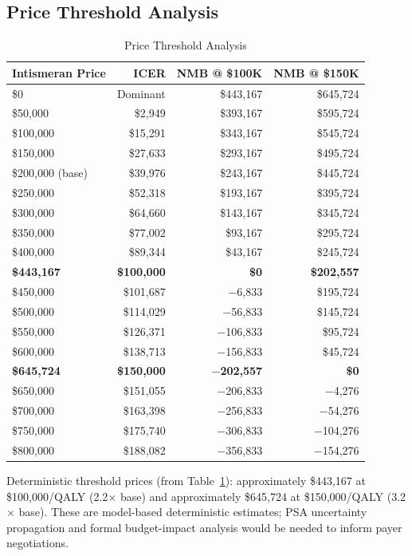 \documentclass[11pt,a4paper]{article}
\begin{document}
\subsection{Price Threshold Analysis}
\label{sec:price_threshold}
\begin{table}[H]
\centering
\caption{Price Threshold Analysis}
\label{tab:s14}
\begin{tabular*}{\textwidth}{@{\extracolsep{\fill}}lrrr}
\toprule
\textbf{Intismeran Price} & \textbf{ICER} & \textbf{NMB @ \$100K} & \textbf{NMB @ \$150K} \\
\midrule
\$0 & Dominant & \$443,167 & \$645,724 \\
\$50,000 & \$2,949 & \$393,167 & \$595,724 \\
\$100,000 & \$15,291 & \$343,167 & \$545,724 \\
\$150,000 & \$27,633 & \$293,167 & \$495,724 \\
\$200,000 (base) & \$39,976 & \$243,167 & \$445,724 \\
\$250,000 & \$52,318 & \$193,167 & \$395,724 \\
\$300,000 & \$64,660 & \$143,167 & \$345,724 \\
\$350,000 & \$77,002 & \$93,167 & \$295,724 \\
\$400,000 & \$89,344 & \$43,167 & \$245,724 \\
\textbf{\$443,167} & \textbf{\$100,000} & \textbf{\$0} & \textbf{\$202,557} \\
\$450,000 & \$101,687 & $-$6,833 & \$195,724 \\
\$500,000 & \$114,029 & $-$56,833 & \$145,724 \\
\$550,000 & \$126,371 & $-$106,833 & \$95,724 \\
\$600,000 & \$138,713 & $-$156,833 & \$45,724 \\
\textbf{\$645,724} & \textbf{\$150,000} & \textbf{$-$202,557} & \textbf{\$0} \\
\$650,000 & \$151,055 & $-$206,833 & $-$4,276 \\
\$700,000 & \$163,398 & $-$256,833 & $-$54,276 \\
\$750,000 & \$175,740 & $-$306,833 & $-$104,276 \\
\$800,000 & \$188,082 & $-$356,833 & $-$154,276 \\
\end{tabular*}
\end{table}
\noindent Deterministic threshold prices (from Table~\ref{tab:s14}): approximately \$443,167 at \$100,000/QALY (2.2$\times$ base) and approximately \$645,724 at \$150,000/QALY (3.2$\times$ base). These are model-based deterministic estimates; PSA uncertainty propagation and formal budget-impact analysis would be needed to inform payer negotiations.
\end{document}
